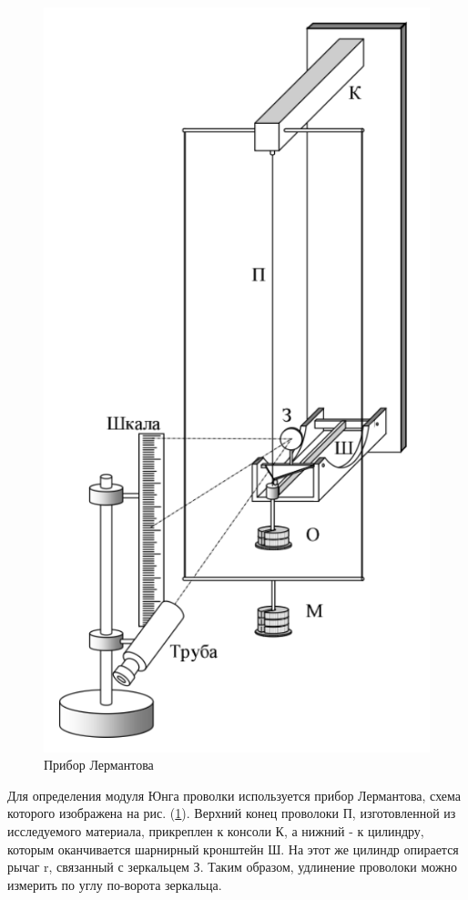 \documentclass[a4paper,12pt]{article}
\begin{document}
\begin{figure} [h] \center
  \includegraphics[scale=0.5]{131-132/pic 1.png}
  \caption[Рис. 1]{Прибор Лермантова} \label{pic:1}
\end{figure}

Для определения модуля Юнга проволки используется прибор Лермантова, схема которого изображена на рис. (\ref{pic:1}). Верхний конец проволоки П, изготовленной из исследуемого материала, прикреплен к консоли К, а нижний - к цилиндру, которым оканчивается шарнирный кронштейн Ш. На этот же цилиндр опирается рычаг r, связанный с зеркальцем З. Таким образом, удлинение проволоки можно измерить по углу по-ворота зеркальца.
\end{document}

